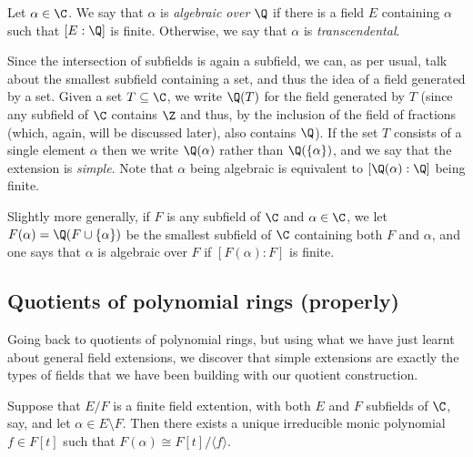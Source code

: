 \documentclass{maths}
\begin{document}
\begin{defn}
    Let $\alpha\in\C$.
    We say that $\alpha$ is \emph{algebraic over $\Q$} if there is a field $E$ containing $\alpha$ such that $[E:\Q]$ is finite.
    Otherwise, we say that $\alpha$ is \emph{transcendental}.

    Since the intersection of subfields is again a subfield, we can, as per usual, talk about the smallest subfield containing a set, and thus the idea of a field generated by a set.
    Given a set $T\subseteq\C$, we write $\Q(T)$ for the field generated by $T$ (since any subfield of $\C$ contains $\Z$ and thus, by the inclusion of the field of fractions (which, again, will be discussed later), also contains $\Q$).
    If the set $T$ consists of a single element $\alpha$ then we write $\Q(\alpha)$ rather than $\Q(\{\alpha\})$, and we say that the extension is \emph{simple}.
    Note that $\alpha$ being algebraic is equivalent to $[\Q(\alpha):\Q]$ being finite.

    Slightly more generally, if $F$ is any subfield of $\C$ and $\alpha\in\C$, we let $F(\alpha)=\Q(F\cup\{\alpha\})$ be the smallest subfield of $\C$ containing both $F$ and $\alpha$, and one says that $\alpha$ is algebraic over $F$ if $[F(\alpha):F]$ is finite.
\end{defn}

\subsection{Quotients of polynomial rings (properly)}

Going back to quotients of polynomial rings, but using what we have just learnt about general field extensions, we discover that simple extensions are exactly the types of fields that we have been building with our quotient construction.

\begin{lem}
    Suppose that $E/F$ is a finite field extention, with both $E$ and $F$ subfields of $\C$, say, and let $\alpha\in E\setminus F$.
    Then there exists a unique irreducible monic polynomial $f\in F[t]$ such that $F(\alpha)\cong F[t]/\langle f\rangle$.
\end{lem}
\end{document}
